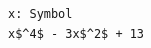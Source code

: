 \documentclass[border=10pt]{standalone}
\begin{document}
\begin{lstlisting}
x: Symbol
x$^4$ - 3x$^2$ + 13
\end{lstlisting}
\end{document}
